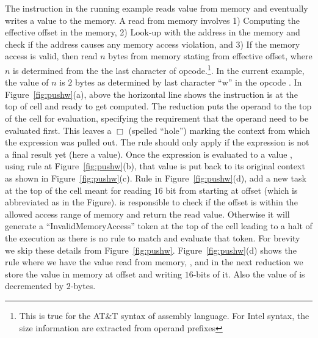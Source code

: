 The instruction in the running example reads value from memory and eventually writes a value to the memory. A read from memory involves 1) Computing the effective offset in the memory, 2) Look-up with the address in the memory and check if the address causes any memory access violation, and 3) If the memory access is valid, then read $n$ bytes from memory stating from effective offset, where $n$ is determined from the the last character of opcode.\footnote{This is true for the AT\&T syntax of assembly language. For Intel syntax, the size information are extracted from operand prefixes}. In the current example, the value of $n$ is $2$ bytes as determined by last character ``w'' in the opcode . In Figure~\ref{fig:pushw}(a),  above the horizontal line shows the instruction is at the top of  cell and ready to get computed. The reduction puts the operand  to the top of the cell for evaluation, specifying the requirement that the operand need to be evaluated first. This leaves a $\Box$ (spelled ``hole'') marking the context 
from which the expression  was pulled out. The rule should only apply
if the expression is not a final result yet (here a  value). Once the expression is evaluated to a  value , using rule at Figure~\ref{fig:pushw}(b), that value is put back to its original context as shown in Figure~\ref{fig:pushw}(c). Rule in Figure~\ref{fig:pushw}(d), add a new task at the top of the  cell meant for reading $16$ bit from  starting at offset  (which is abbreviated as  in the Figure).  is responsible to check if the offset  is within the allowed access range of memory and return the read value. Otherwise it will generate a ``InvalidMemoryAccess'' token at the top of the  cell leading to a halt of the \K execution as there is no rule to match and evaluate that token. For brevity we skip these details from Figure~\ref{fig:pushw}.  Figure~\ref{fig:pushw}(d) shows the rule where we have the value read from memory, , and in the next reduction we store the value in memory at offset  and writing $16$-bits of it. Also the value of  is decremented by $2$-bytes. 

